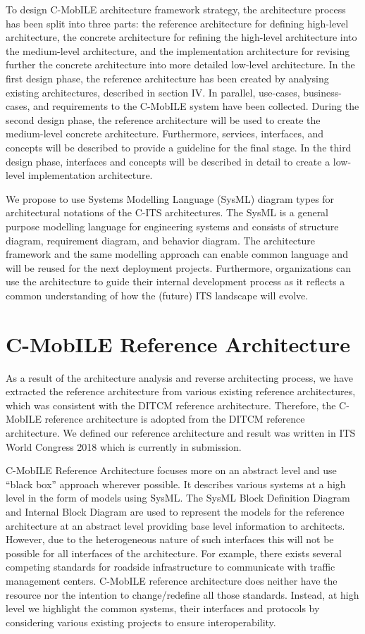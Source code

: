 \documentclass[conference]{IEEEtran}
\begin{document}
To design C-MobILE architecture framework strategy, the architecture process has been split into three parts: the reference architecture for defining high-level architecture, the concrete architecture for refining the high-level architecture into the medium-level architecture, and the implementation architecture for revising further the concrete architecture into more detailed low-level architecture. In the first design phase, the reference architecture has been created by analysing existing architectures, described in section IV. In parallel, use-cases, business-cases, and requirements to the C-MobILE system have been collected. During the second design phase, the reference architecture will be used to create the medium-level concrete architecture. Furthermore, services, interfaces, and concepts will be described to provide a guideline for the final stage. In the third design phase, interfaces and concepts will be described in detail to create a low-level implementation architecture.

We propose to use Systems Modelling Language (SysML) diagram types for architectural notations of the C-ITS architectures. The SysML is a general purpose modelling language for engineering systems and consists of structure diagram, requirement diagram, and behavior diagram. The architecture framework and the same modelling approach can enable common language and will be reused for the next deployment projects. Furthermore, organizations can use the architecture to guide their internal development process as it reflects a common understanding of how the (future) ITS landscape will evolve.


\section{C-MobILE Reference Architecture}

As a result of the architecture analysis and reverse architecting process, we have extracted the reference architecture from various existing reference architectures, which was consistent with the DITCM reference architecture. Therefore, the C-MobILE reference architecture is adopted from the DITCM reference architecture. We defined our reference architecture and result was written in ITS World Congress 2018 which is currently in submission.

C-MobILE Reference Architecture focuses more on an abstract level and use “black box” approach wherever possible. It describes various systems at a high level in the form of models using SysML. The SysML Block Definition Diagram and Internal Block Diagram are used to represent the models for the reference architecture at an abstract level providing base level information to architects. However, due to the heterogeneous nature of such interfaces this will not be possible for all interfaces of the architecture. For example, there exists several competing standards for roadside infrastructure to communicate with traffic management centers. C-MobILE reference architecture does neither have the resource nor the intention to change/redefine all those standards. Instead, at high level we highlight the common systems, their interfaces and protocols by considering various existing projects to ensure interoperability. 
\end{document}

